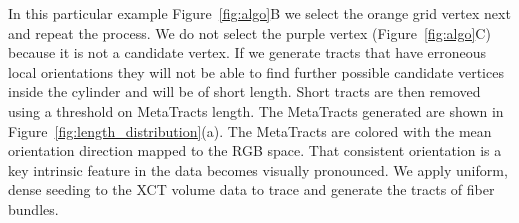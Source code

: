  In this particular example Figure~\ref{fig:algo}B we select the orange grid vertex next and repeat the process. We do not select the purple vertex (Figure~\ref{fig:algo}C) because it is not a candidate vertex. If we generate tracts that have erroneous local orientations they will not be able to find further possible candidate vertices inside the cylinder and will be of short length. Short tracts are then removed using a threshold on MetaTracts  length. The MetaTracts generated are shown in Figure~\ref{fig:length_distribution}(a). The MetaTracts are colored with the mean orientation direction mapped to the RGB space. That consistent orientation is a key intrinsic feature in the data becomes visually pronounced.
 We apply uniform, dense seeding to the XCT volume data to trace and generate the tracts of fiber bundles. 
 
 
%
 


